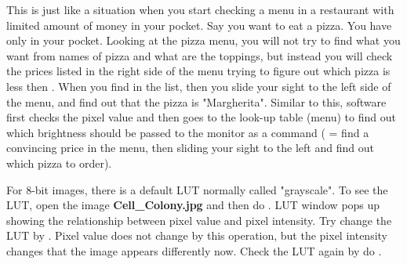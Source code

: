 This is just like a situation when you start checking a menu in a
restaurant with limited amount of money in your pocket. Say you want to
eat a pizza. You have only  in your pocket. Looking at the
pizza menu, you will not try to find what you want from names of pizza
and what are the toppings, but instead you will check the prices listed
in the right side of the menu trying to figure out which pizza is less
then . When you find  in the list, then you slide your
sight to the left side of the menu, and find out that the pizza is
"Margherita". Similar to this,
software first checks the pixel value and then goes to the look-up
table (menu) to find out which brightness should be passed to the
monitor as a command ( = find a convincing price in the menu, then
sliding your sight to the left and find out which pizza to order).



\begin{indentexercise}{1}
For 8-bit images, there is a default LUT normally called "grayscale". To see the LUT, open the image \textbf{Cell\_Colony.jpg} and then do . LUT window pops up showing the relationship between pixel value and pixel intensity. Try change the LUT by . Pixel value does not change by this operation, but the pixel intensity changes that the image appears differently now. Check the LUT again by do . 
\end{indentexercise}

